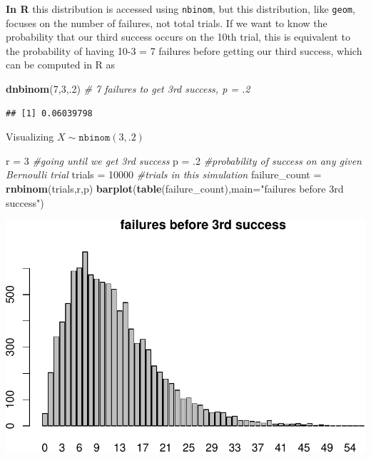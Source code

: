 \documentclass[
]{book}
\newenvironment{Shaded}{\begin{snugshade}}{\end{snugshade}}
\newcommand{\AttributeTok}[1]{\textcolor[rgb]{0.13,0.29,0.53}{#1}}
\newcommand{\CommentTok}[1]{\textcolor[rgb]{0.56,0.35,0.01}{\textit{#1}}}
\newcommand{\DecValTok}[1]{\textcolor[rgb]{0.00,0.00,0.81}{#1}}
\newcommand{\FunctionTok}[1]{\textcolor[rgb]{0.13,0.29,0.53}{\textbf{#1}}}
\newcommand{\NormalTok}[1]{#1}
\newcommand{\OtherTok}[1]{\textcolor[rgb]{0.56,0.35,0.01}{#1}}
\newcommand{\StringTok}[1]{\textcolor[rgb]{0.31,0.60,0.02}{#1}}
\theoremstyle{definition}
\theoremstyle{definition}
\theoremstyle{definition}
\theoremstyle{definition}
\theoremstyle{remark}
\begin{document}
\textbf{In R} this distribution is accessed using \texttt{nbinom}, but this distribution, like \texttt{geom}, focuses on the number of failures, not total trials. If we want to know the probability that our third success occurs on the 10th trial, this is equivalent to the probability of having 10-3 = 7 failures before getting our third success, which can be computed in R as

\begin{Shaded}
\begin{Highlighting}[]
\FunctionTok{dnbinom}\NormalTok{(}\DecValTok{7}\NormalTok{,}\DecValTok{3}\NormalTok{,.}\DecValTok{2}\NormalTok{) }\CommentTok{\# 7 failures to get 3rd success, p = .2}
\end{Highlighting}
\end{Shaded}

\begin{verbatim}
## [1] 0.06039798
\end{verbatim}

Visualizing \(X \sim \texttt{nbinom}(3,.2)\)

\begin{Shaded}
\begin{Highlighting}[]
\NormalTok{r }\OtherTok{=} \DecValTok{3} \CommentTok{\#going until we get 3rd success}
\NormalTok{p }\OtherTok{=}\NormalTok{ .}\DecValTok{2} \CommentTok{\#probability of success on any given Bernoulli trial}
\NormalTok{trials }\OtherTok{=} \DecValTok{10000} \CommentTok{\#trials in this simulation}
\NormalTok{failure\_count }\OtherTok{=} \FunctionTok{rnbinom}\NormalTok{(trials,r,p)}
\FunctionTok{barplot}\NormalTok{(}\FunctionTok{table}\NormalTok{(failure\_count),}\AttributeTok{main=}\StringTok{"failures before 3rd success"}\NormalTok{)}
\end{Highlighting}
\end{Shaded}

\includegraphics{math340-notes_files/figure-latex/unnamed-chunk-144-1.pdf}
\end{document}
